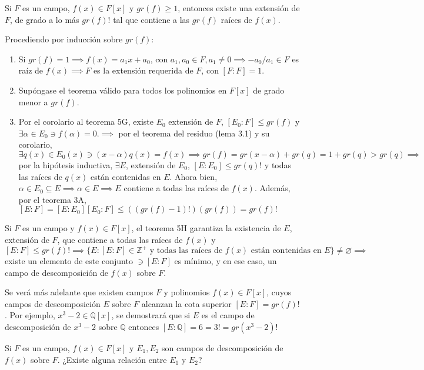 \begin{teorema}
    Si $F$ es un campo, $f(x)\in F[x]$ y $gr(f)\geq 1$, entonces existe una extensión de $F$, de grado a lo más $gr(f)!$ tal que contiene a las $gr(f)$ raíces de $f(x)$. 
    \begin{dem}
        Procediendo por inducción sobre $gr(f)$:
        \begin{enumerate}
            \item Si $gr(f)=1\implies f(x)=a_1x+a_0$, con $a_1,a_0\in F,a_1\neq 0\implies -a_0/a_1 \in F$ es raíz de $f(x)\implies F$ es la extensión requerida de $F$, con $[F:F]=1$.
            \item Supóngase el teorema válido para todos los polinomios en $F[x]$ de grado menor a $gr(f)$. 
            \item Por el corolario al teorema 5G, existe $E_0$ extensión de $F$, $[E_0:F]\leq gr(f)$ y $\exists \alpha \in E_0\ni f(\alpha)=0$.$\implies$ por el teorema del residuo (lema 3.1) y su corolario, $\exists q(x)\in E_0(x)\ni (x-\alpha)q(x)=f(x)\implies gr(f)=gr(x-\alpha)+gr(q)=1+gr(q)>gr(q)\implies$ por la hipótesis inductiva, $\exists E$, extensión de $E_0$, $[E:E_0]\leq gr(q)!$ y todas las raíces de $q(x)$ están contenidas en $E$. Ahora bien, $\alpha\in E_0\subseteq E\implies \alpha\in E\implies E$ contiene a todas las raíces de $f(x)$. Además, por el teorema 3A, $[E:F]=[E:E_0][E_0:F]\leq ((gr(f)-1)!)(gr(f))=gr(f)!$        
        \end{enumerate}
    \end{dem}
\end{teorema}

\begin{cajita}
    \begin{nota}
        Si $F$ es un campo y $f(x)\in F[x]$, el teorema 5H garantiza la existencia de $E$, extensión de $F$, que contiene a todas las raíces de $f(x)$ y $[E:F]\leq gr(f)!\implies \{E:[E:F]\in \mathbb{Z}^+ \text{ y todas las raíces de $f(x)$ están contenidas en $E$}\}\neq \varnothing\implies$ existe un elemento de este conjunto $\ni[E:F]$ es mínimo, y en ese caso, un campo de descomposición de $f(x)$ sobre $F$. 
    \end{nota}
    \begin{nota}
        Se verá más adelante que existen campos $F$ y polinomios $f(x)\in F[x]$, cuyos campos de descomposición $E$ sobre $F$ alcanzan la cota superior $[E:F]=gr(f)!$. Por ejemplo, $x^3-2\in \mathbb{Q}[x]$, se demostrará que si $E$ es el campo de descomposición de $x^3-2$ sobre $\mathbb{Q}$ entonces $[E:\mathbb{Q}]=6=3!=gr(x^3-2)!$
    \end{nota}
    \begin{nota}
        Si $F$ es un campo, $f(x)\in F[x]$ y $E_1,E_2$ son campos de descomposición de $f(x)$ sobre $F$. ¿Existe alguna relación entre $E_1$ y $E_2$?
    \end{nota}
\end{cajita}
